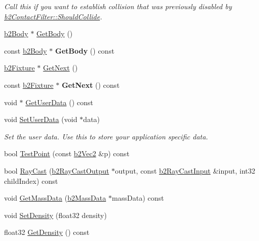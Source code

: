\begin{DoxyCompactItemize}
\begin{DoxyCompactList}\small\item\em Call this if you want to establish collision that was previously disabled by \hyperlink{classb2_contact_filter_a0e33d4fc90a9345160a07cc494b45ecd}{b2\+Contact\+Filter\+::\+Should\+Collide}. \end{DoxyCompactList}\item 
\hyperlink{classb2_body}{b2\+Body} $\ast$ \hyperlink{classb2_fixture_a9d6536ef274d768e86ab0a8330921535}{Get\+Body} ()
\item 
const \hyperlink{classb2_body}{b2\+Body} $\ast$ {\bfseries Get\+Body} () const \hypertarget{classb2_fixture_a6cfc4ed94c4cbfbc0244f11007448431}{}\label{classb2_fixture_a6cfc4ed94c4cbfbc0244f11007448431}

\item 
\hyperlink{classb2_fixture}{b2\+Fixture} $\ast$ \hyperlink{classb2_fixture_a0241952461f6f1a04a3c850306390fd2}{Get\+Next} ()
\item 
const \hyperlink{classb2_fixture}{b2\+Fixture} $\ast$ {\bfseries Get\+Next} () const \hypertarget{classb2_fixture_adb72f9669165143466a1d37d1288785f}{}\label{classb2_fixture_adb72f9669165143466a1d37d1288785f}

\item 
void $\ast$ \hyperlink{classb2_fixture_a57247425e7c859d7653eec417ec83cdc}{Get\+User\+Data} () const 
\item 
void \hyperlink{classb2_fixture_a3db7f89ef4493247d922fe3d96351ad9}{Set\+User\+Data} (void $\ast$data)\hypertarget{classb2_fixture_a3db7f89ef4493247d922fe3d96351ad9}{}\label{classb2_fixture_a3db7f89ef4493247d922fe3d96351ad9}

\begin{DoxyCompactList}\small\item\em Set the user data. Use this to store your application specific data. \end{DoxyCompactList}\item 
bool \hyperlink{classb2_fixture_ab875147c7a9df4ff94d224f6aa81a7a9}{Test\+Point} (const \hyperlink{structb2_vec2}{b2\+Vec2} \&p) const 
\item 
bool \hyperlink{classb2_fixture_a614e84f47e8b32b503fa719099ecba79}{Ray\+Cast} (\hyperlink{structb2_ray_cast_output}{b2\+Ray\+Cast\+Output} $\ast$output, const \hyperlink{structb2_ray_cast_input}{b2\+Ray\+Cast\+Input} \&input, int32 child\+Index) const 
\item 
void \hyperlink{classb2_fixture_adbfb9b64006abaaa0ca01e6d9e06deea}{Get\+Mass\+Data} (\hyperlink{structb2_mass_data}{b2\+Mass\+Data} $\ast$mass\+Data) const 
\item 
void \hyperlink{classb2_fixture_ad4e1d9323103975c8931d022b952d04a}{Set\+Density} (float32 density)
\item 
float32 \hyperlink{classb2_fixture_a5deb4acfb464f3dcb668f081a2c44ff4}{Get\+Density} () const \hypertarget{classb2_fixture_a5deb4acfb464f3dcb668f081a2c44ff4}{}\label{classb2_fixture_a5deb4acfb464f3dcb668f081a2c44ff4}


\end{DoxyCompactItemize}
